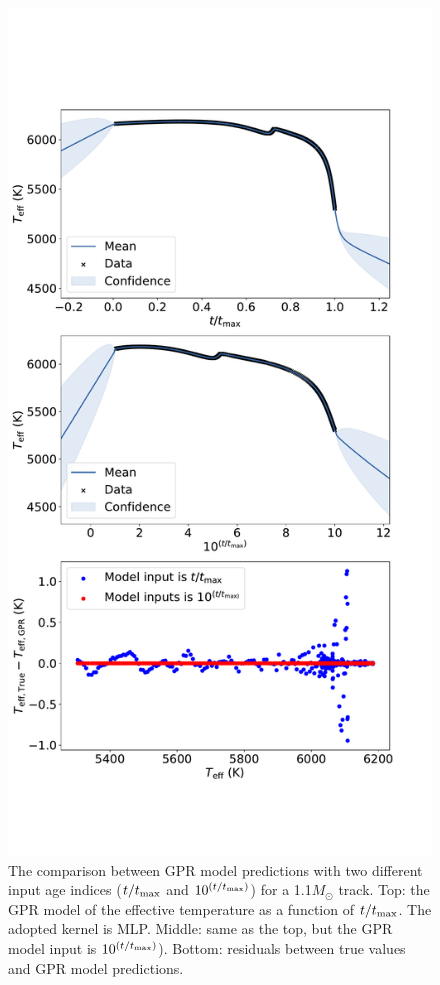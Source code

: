 \begin{figure}
	\includegraphics[width=1.0\columnwidth]{selection_of_t.pdf}
    \caption{The comparison between GPR model predictions with two different input age indices ($t/t_{\rm max}$ and $10^{(t/t_{\rm max})}$) for a 1.1$M_{\odot}$ track. Top: the GPR model of the effective temperature as a function of $t/t_{\rm max}$. The adopted kernel is MLP. Middle: same as the top, but the GPR model input is $10^{(t/t_{\rm max})}$). Bottom: residuals between true values and GPR model predictions. }
    \label{fig:selection_of_t}
\end{figure}


